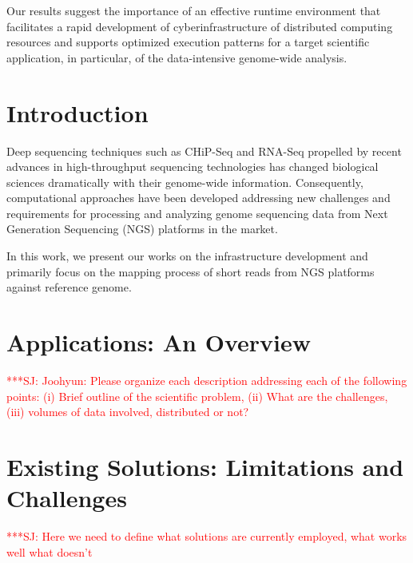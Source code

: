 \documentclass[12pt]{article}
\newcommand{\jhanote}[1]{ {\textcolor{red}     {***SJ: #1}}}
\newcommand{\jhanote}[1]{}
\begin{document}
Our results suggest the importance of an effective runtime environment
that facilitates a rapid development of cyberinfrastructure of
distributed computing resources and supports optimized execution
patterns for a target scientific application, in particular, of the
data-intensive genome-wide analysis.

\section{Introduction}

% 
% 

Deep sequencing techniques such as CHiP-Seq and RNA-Seq propelled by recent advances in high-throughput sequencing technologies has changed biological sciences dramatically with their genome-wide information.  Consequently, computational approaches have been developed addressing new challenges and requirements for processing and analyzing genome sequencing data from Next Generation Sequencing (NGS) platforms in the market.  

In this work, we present our works on the infrastructure development and primarily focus on the mapping process of short reads from NGS platforms against reference genome.  


\section{Applications: An Overview}

\jhanote{Joohyun: Please organize each description addressing each of
  the following points: (i) Brief outline of the scientific problem,
  (ii) What are the challenges, (iii) volumes of data involved,
  distributed or not?}






\section{Existing Solutions: Limitations and Challenges}

\jhanote{Here we need to define what solutions are currently employed, what works well
  what doesn't}
\end{document}
